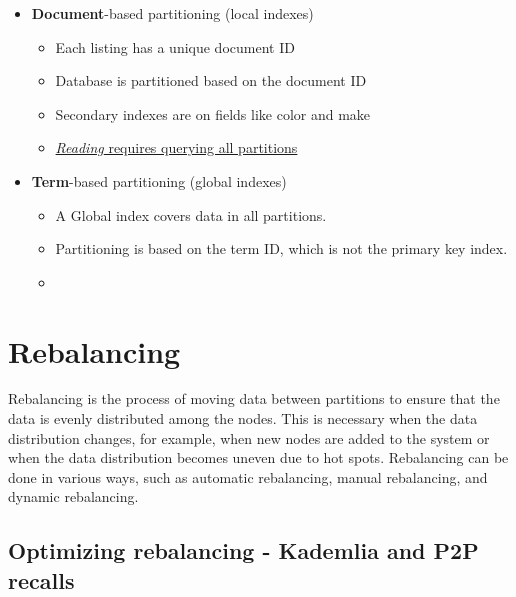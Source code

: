 \begin{itemize}
   \item \textbf{Document}-based partitioning (local indexes)
   \begin{itemize}
      \item Each listing has a unique document ID
      \item Database is partitioned based on the document ID
      \item Secondary indexes are on fields like color and make
      \item \ul{\textit{Reading} requires querying all partitions}
   \end{itemize}
   \item \textbf{Term}-based partitioning (global indexes)
   \begin{itemize}
      \item A Global index covers data in all partitions.
      \item Partitioning is based on the term ID, which is not the primary key index.
      \item 
   \end{itemize}
\end{itemize}

\section{Rebalancing}
Rebalancing is the process of moving data between partitions to ensure that the data is evenly distributed among the nodes. This is necessary when the data distribution changes, for example, when new nodes are added to the system or when the data distribution becomes uneven due to hot spots. Rebalancing can be done in various ways, such as automatic rebalancing, manual rebalancing, and dynamic rebalancing.


\subsection{Optimizing rebalancing - Kademlia and P2P recalls}

